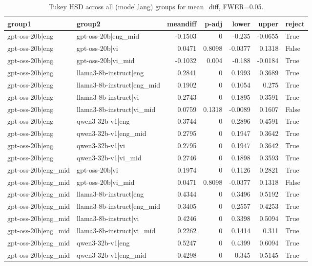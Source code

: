 \begin{table}
\caption{Tukey HSD across all (model,lang) groups for mean_diff, FWER=0.05.}
\label{tab:tukey_all_models_all_langs_mean_diff}
\begin{tabular}{l l r r r r l}
\toprule
group1 & group2 & meandiff & p-adj & lower & upper & reject \\
\midrule
gpt-oss-20b|eng & gpt-oss-20b|eng_mid & -0.1503 & 0 & -0.235 & -0.0655 & True \\
gpt-oss-20b|eng & gpt-oss-20b|vi & 0.0471 & 0.8098 & -0.0377 & 0.1318 & False \\
gpt-oss-20b|eng & gpt-oss-20b|vi_mid & -0.1032 & 0.004 & -0.188 & -0.0184 & True \\
gpt-oss-20b|eng & llama3-8b-instruct|eng & 0.2841 & 0 & 0.1993 & 0.3689 & True \\
gpt-oss-20b|eng & llama3-8b-instruct|eng_mid & 0.1902 & 0 & 0.1054 & 0.275 & True \\
gpt-oss-20b|eng & llama3-8b-instruct|vi & 0.2743 & 0 & 0.1895 & 0.3591 & True \\
gpt-oss-20b|eng & llama3-8b-instruct|vi_mid & 0.0759 & 0.1318 & -0.0089 & 0.1607 & False \\
gpt-oss-20b|eng & qwen3-32b-v1|eng & 0.3744 & 0 & 0.2896 & 0.4591 & True \\
gpt-oss-20b|eng & qwen3-32b-v1|eng_mid & 0.2795 & 0 & 0.1947 & 0.3642 & True \\
gpt-oss-20b|eng & qwen3-32b-v1|vi & 0.2795 & 0 & 0.1947 & 0.3642 & True \\
gpt-oss-20b|eng & qwen3-32b-v1|vi_mid & 0.2746 & 0 & 0.1898 & 0.3593 & True \\
gpt-oss-20b|eng_mid & gpt-oss-20b|vi & 0.1974 & 0 & 0.1126 & 0.2821 & True \\
gpt-oss-20b|eng_mid & gpt-oss-20b|vi_mid & 0.0471 & 0.8098 & -0.0377 & 0.1318 & False \\
gpt-oss-20b|eng_mid & llama3-8b-instruct|eng & 0.4344 & 0 & 0.3496 & 0.5192 & True \\
gpt-oss-20b|eng_mid & llama3-8b-instruct|eng_mid & 0.3405 & 0 & 0.2557 & 0.4253 & True \\
gpt-oss-20b|eng_mid & llama3-8b-instruct|vi & 0.4246 & 0 & 0.3398 & 0.5094 & True \\
gpt-oss-20b|eng_mid & llama3-8b-instruct|vi_mid & 0.2262 & 0 & 0.1414 & 0.311 & True \\
gpt-oss-20b|eng_mid & qwen3-32b-v1|eng & 0.5247 & 0 & 0.4399 & 0.6094 & True \\
gpt-oss-20b|eng_mid & qwen3-32b-v1|eng_mid & 0.4298 & 0 & 0.345 & 0.5145 & True \\

\end{tabular}
\end{table}
